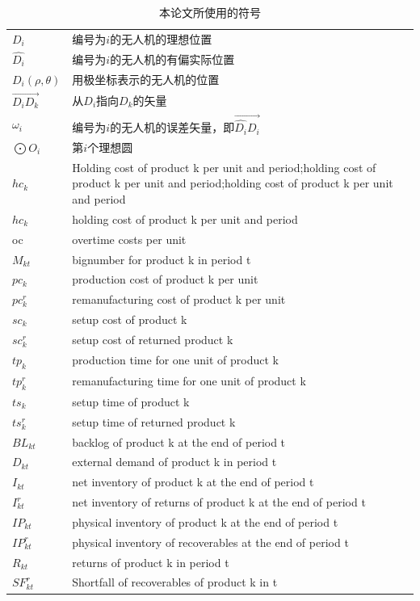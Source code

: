 \documentclass{cumcmthesis}
\begin{document}
		\begin{center}
			\begin{table}[h]
				\caption{本论文所使用的符号}
				\begin{tabularx}{\textwidth}{p{0.08\textwidth}X}
					\toprule	
					
					$D_i$ & 编号为$i$的无人机的理想位置  \\
					$\widehat{D_i}$ & 编号为$i$的无人机的有偏实际位置  \\
					$D_i(\rho,\theta)$ & 用极坐标表示的无人机的位置 \\
					  
					$\overrightarrow{D_iD_k}$ & 从$D_i$指向$D_k$的矢量 \\
					$\omega_i$      & 编号为$i$的无人机的误差矢量，即$\overrightarrow{\widehat{D_i}D_i}$ \\
					$\bigodot O_i$    & 第$i$个理想圆  \\
					
					$hc_k$     & Holding cost of product k per unit and period;holding cost of product k per unit and period;holding cost of product k per unit and period   \\
					$hc_k$     & holding cost of product k per unit and period   \\
					oc   & overtime costs per unit   \\
					$M_{kt}$   & bignumber for product k in period t\\
					$pc_{k}$   & production cost of product k per unit\\
					$pc^r_{k}$ & remanufacturing cost of product k per unit\\
					$sc_{k}$   &  setup cost of product k\\
					$sc^r_{k}$ &  setup cost of returned product k\\
					$tp_{k}$   &  production time for one unit of product k\\
					$tp^r_{k}$ & remanufacturing time for one unit of product k\\
					$ts_{k}$   & setup time of product k\\
					$ts^r_{k}$ & setup time of returned product k\\
					
					 
					$BL_{kt}$  & backlog of product k at the end of period t\\
					$D_{kt}$   & external demand of product k in period t  \\
					$I_{kt}$   & net inventory of product k at the end of period t  \\
					$I^r_{kt}$ & net inventory of returns of product k at the end of period t  \\
					$IP_{kt} $  & physical inventory of product k at the end of period t \\
					$IP^r_{kt}$   & physical inventory of recoverables at the end of period t \\
					$R_{kt}$   &  returns of product k in period t\\
					$SF^r_{kt}$   &  Shortfall of recoverables of product k in t \\
					\bottomrule
				\end{tabularx}
			\end{table}
		

\end{center}
\end{document}
